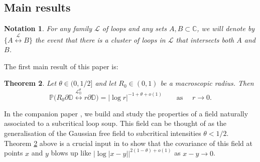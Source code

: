 \documentclass[11pt]{article}
\newtheorem{theorem}{Theorem}[section]
\newtheorem{notation}[theorem]{Notation}
\theoremstyle{remark}
\newcommand{\C}{\mathbb{C}}
\newcommand{\D}{\mathbb{D}}
\newcommand{\Lc}{\mathcal{L}}
\renewcommand{\P}{\mathbb{P}}
\numberwithin{equation}{section}
\begin{document}
\subsection{Main results}\label{S:intro_crossing}

\begin{notation}
For any family $\Lc$ of loops and any sets $A, B \subset \C$, we will denote by $\{ A \overset{\Lc}{\leftrightarrow} B \}$ the event that there is a cluster of loops in $\Lc$ that intersects both $A$ and $B$.
\end{notation}


The first main result of this paper is:

\begin{theorem}\label{T:large_crossing}
Let $\theta \in (0,1/2]$ and let $R_0 \in (0,1)$ be a macroscopic radius. Then
\[
\P \Big( R_0 \partial \D \overset{\Lc_\D^\theta}{\longleftrightarrow} r \partial \D \Big)
= |\log r|^{-1+ \theta +o(1)}
\quad \quad \text{as~} \quad r \to 0.
\]
\end{theorem}


In the companion paper \cite{JLQ23b}, we build and study the properties of a field naturally associated to a subcritical loop soup. This field can be thought of as the generalisation of the Gaussian free field to subcritical intensities $\theta < 1/2$. Theorem \ref{T:large_crossing} above is a crucial input in \cite{JLQ23b} to show that the covariance of this field at points $x$ and $y$ blows up like $|\log |x-y||^{2(1-\theta) + o(1)}$ as $x-y \to 0$.
\end{document}
